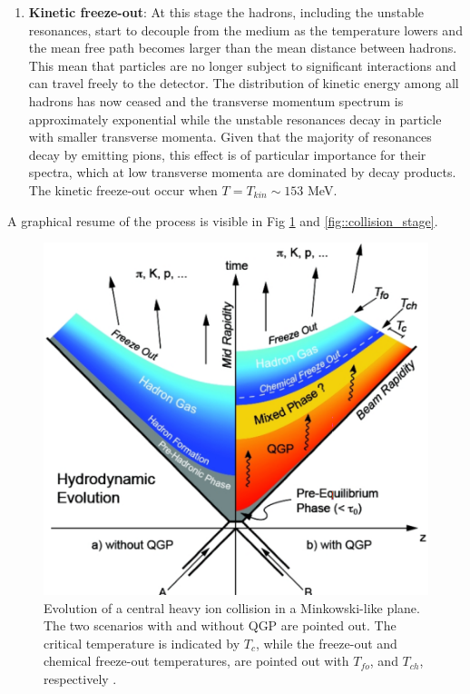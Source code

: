 \documentclass[12pt,a4paper]{book}
\begin{document}
\begin{enumerate}
		\item \textbf{Kinetic freeze-out}: At this stage the hadrons, including the unstable resonances, start to decouple from the medium as the temperature lowers and the mean free path becomes larger than the mean distance between hadrons. This mean that particles are no longer subject to significant interactions and can travel freely to the detector. The distribution of kinetic energy among all hadrons has now ceased and the transverse momentum spectrum is approximately exponential while the unstable resonances decay in particle with smaller transverse momenta. Given that the majority of resonances decay by emitting pions, this effect is of particular importance for their spectra, which at low transverse momenta are dominated by decay products. The kinetic freeze-out occur when $T= T_{kin} \sim 153$ MeV. 

	\end{enumerate}
	A graphical resume of the process is visible in Fig \ref{fig:collision_stage_mikowsky} and \ref{fig::collision_stage}.  
	\begin{figure}[ht]
		\centering
		\includegraphics[width=0.6\linewidth]{pictures/collision_stage_mikowsky.png}
		\caption{Evolution of a central heavy ion collision in a Minkowski-like plane. The two scenarios with and without QGP are pointed out. The critical temperature is indicated by $T_c$, while the freeze-out and chemical freeze-out temperatures, are pointed out with $T_{fo}$, and $T_{ch}$, respectively \cite{EvolutionofcollisionsandQGP}.}
		\label{fig:collision_stage_mikowsky} 
	\end{figure}
	
\end{document}
